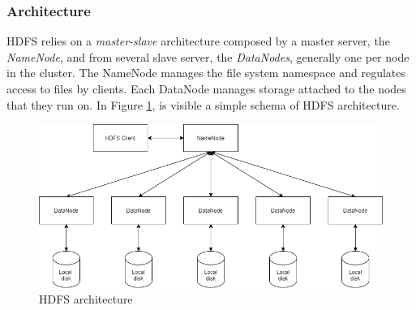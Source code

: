 \documentclass[\main/main.tex]{subfiles}
\begin{document}
\subsubsection{Architecture} HDFS relies on a \emph{master-slave} architecture composed by a master server, the \emph{NameNode}, and from several slave server, the \emph{DataNodes}, generally one per node in the cluster. The NameNode manages the file system namespace and regulates access to files by clients. Each DataNode manages storage attached to the nodes that they run on. In Figure \ref{fig:hdfs_architecture}, is visible a simple schema of HDFS architecture.
\begin{figure}[H]
    \centering
    \includegraphics[scale=.5]{images/cluster_computing/hdfs_architecture.png}
    \caption{HDFS  architecture}
    \label{fig:hdfs_architecture}
\end{figure}
\end{document}
